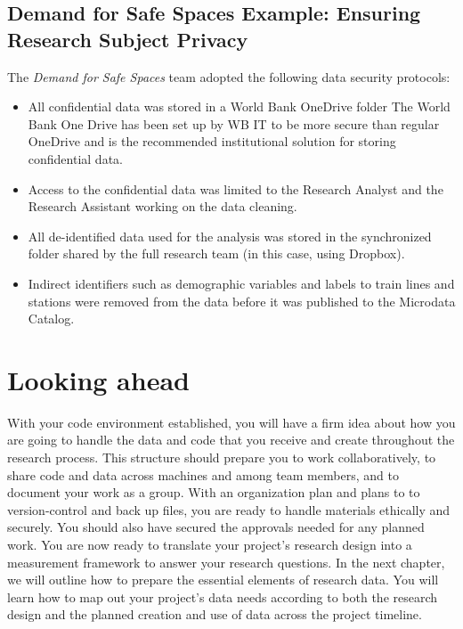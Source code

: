 \documentclass[
]{book}
\providecommand{\tightlist}{%
  \setlength{\itemsep}{0pt}\setlength{\parskip}{0pt}}
\begin{document}
\begin{ex}
\hypertarget{demand-for-safe-spaces-example-ensuring-research-subject-privacy}{%
\subsection*{Demand for Safe Spaces Example: Ensuring Research Subject Privacy}\label{demand-for-safe-spaces-example-ensuring-research-subject-privacy}}

The \emph{Demand for Safe Spaces} team adopted the following data security protocols:

\begin{itemize}
\tightlist
\item
  All confidential data was stored in a World Bank OneDrive folder The World Bank One Drive has been set up by WB IT to be more secure than regular OneDrive and is the recommended institutional solution for storing confidential data.
\item
  Access to the confidential data was limited to the Research Analyst and the Research Assistant working on the data cleaning.
\item
  All de-identified data used for the analysis was stored in the synchronized folder shared by the full research team (in this case, using Dropbox).
\item
  Indirect identifiers such as demographic variables and labels to train lines and stations were removed from the data before it was published to the Microdata Catalog.
\end{itemize}
\end{ex}

\hypertarget{looking-ahead-2}{%
\section*{Looking ahead}\label{looking-ahead-2}}

With your code environment established,
you will have a firm idea about how you are going to
handle the data and code that
you receive and create throughout the research process.
This structure should prepare you to work collaboratively,
to share code and data across machines and among team members,
and to document your work as a group.
With an organization plan
and plans to to version-control and back up files,
you are ready to handle materials ethically and securely.
You should also have secured the approvals needed for any planned work.
You are now ready to translate your project's research design into a measurement framework
to answer your research questions.
In the next chapter,
we will outline how to prepare the essential elements of research data.
You will learn how to map out your project's data needs
according to both the research design
and the planned creation and use of data across the project timeline.
\end{document}
